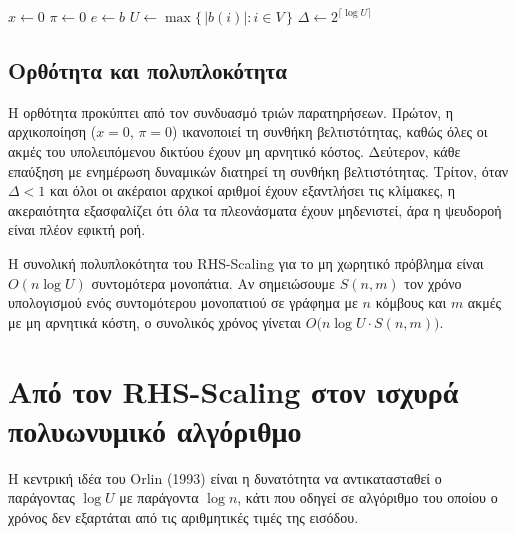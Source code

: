 \documentclass[11pt,a4paper,oneside]{report}
\let\oldsubsection\subsection
\renewcommand{\subsection}{\FloatBarrier\oldsubsection}
\begin{document}
\begin{algorithm}[H]
\caption{\textenglish{RHS-Scaling} (Εικόνα~3 του άρθρου του \textenglish{Orlin})}
$x \leftarrow 0$\;
$\pi \leftarrow 0$\;
$e \leftarrow b$\;
$U \leftarrow \max\{\,|b(i)| : i \in V\,\}$\;
$\Delta \leftarrow 2^{\lceil \log U \rceil}$\;
\end{algorithm}

\subsection{Ορθότητα και πολυπλοκότητα}

Η ορθότητα προκύπτει από τον συνδυασμό τριών παρατηρήσεων. Πρώτον, η αρχικοποίηση ($x = 0$, $\pi = 0$) ικανοποιεί τη συνθήκη βελτιστότητας, καθώς όλες οι ακμές του υπολειπόμενου δικτύου έχουν μη αρνητικό κόστος. Δεύτερον, κάθε επαύξηση με ενημέρωση δυναμικών διατηρεί τη συνθήκη βελτιστότητας. Τρίτον, όταν $\Delta < 1$ και όλοι οι ακέραιοι αρχικοί αριθμοί έχουν εξαντλήσει τις κλίμακες, η ακεραιότητα εξασφαλίζει ότι όλα τα πλεονάσματα έχουν μηδενιστεί, άρα η ψευδοροή είναι πλέον εφικτή ροή.

Η συνολική πολυπλοκότητα του \textenglish{RHS-Scaling} για το μη χωρητικό πρόβλημα είναι $O(n\log U)$ συντομότερα μονοπάτια. Αν σημειώσουμε $S(n,m)$ τον χρόνο υπολογισμού ενός συντομότερου μονοπατιού σε γράφημα με $n$ κόμβους και $m$ ακμές με μη αρνητικά κόστη, ο συνολικός χρόνος γίνεται $O\bigl(n\log U \cdot S(n,m)\bigr)$.

\section{Από τον \textenglish{RHS-Scaling} στον ισχυρά πολυωνυμικό αλγόριθμο}

Η κεντρική ιδέα του \textenglish{Orlin} (1993) είναι η δυνατότητα να αντικατασταθεί ο παράγοντας $\log U$ με παράγοντα $\log n$, κάτι που οδηγεί σε αλγόριθμο του οποίου ο χρόνος δεν εξαρτάται από τις αριθμητικές τιμές της εισόδου.
\end{document}
